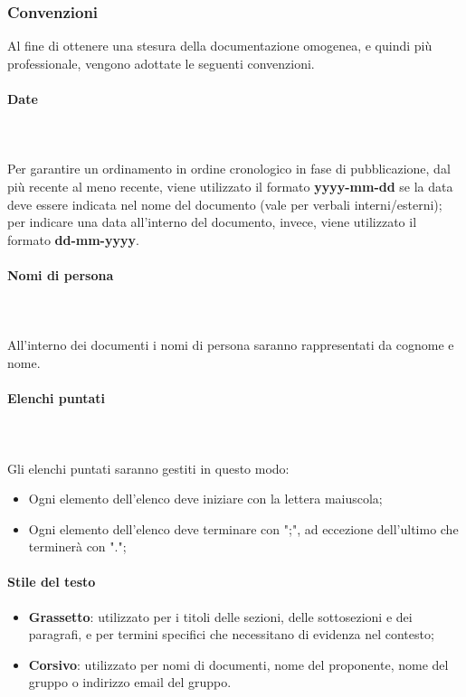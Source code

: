 \subsubsection{Convenzioni}
Al fine di ottenere una stesura della documentazione omogenea, e quindi più
professionale, vengono adottate le seguenti convenzioni.
\paragraph{Date}
~\\\\Per garantire un ordinamento in ordine cronologico in fase di pubblicazione,
dal più recente al meno recente, viene utilizzato il formato
\textbf{yyyy-mm-dd} se la data deve essere indicata nel nome del documento
(vale per verbali interni/esterni); per indicare una data all'interno del
documento, invece, viene utilizzato il formato \textbf{dd-mm-yyyy}.
\paragraph{Nomi di persona}
~\\\\All'interno dei documenti i nomi di persona saranno rappresentati da cognome e
nome.
\paragraph{Elenchi puntati}
~\\\\Gli elenchi puntati saranno gestiti in questo modo:
\begin{itemize}
      \item Ogni elemento dell'elenco deve iniziare con la lettera maiuscola;
      \item Ogni elemento dell'elenco deve terminare con ";", ad eccezione dell'ultimo che
            terminerà con ".";
\end{itemize}
\paragraph{Stile del testo}
\begin{itemize}
      \item \textbf{Grassetto}: utilizzato per i titoli delle sezioni, delle sottosezioni e dei paragrafi,
            e per termini specifici che necessitano di evidenza nel contesto;
      \item \textbf{Corsivo}: utilizzato per nomi di documenti, nome del proponente,
            nome del gruppo o indirizzo email del gruppo.
\end{itemize}
